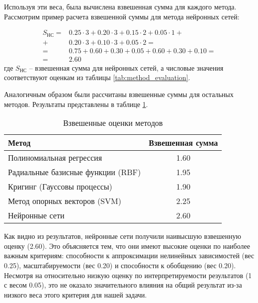 Используя эти веса, была вычислена взвешенная сумма для каждого метода. Рассмотрим пример расчета взвешенной суммы для метода нейронных сетей:

\begin{equation}
	\begin{split}
		S_{НС} = & 0.25 \cdot 3 + 0.20 \cdot 3 + 0.15 \cdot 2 + 0.05 \cdot 1 + \\
		+        & 0.20 \cdot 3 + 0.10 \cdot 3 + 0.05 \cdot 2 =                \\
		=        & 0.75 + 0.60 + 0.30 + 0.05 + 0.60 + 0.30 + 0.10 =            \\
		=        & 2.60
	\end{split}
\end{equation}
где $S_{НС}$ -- взвешенная сумма для нейронных сетей, а числовые значения
соответствуют оценкам из таблицы \ref{tab:method_evaluation}.

Аналогичным образом были рассчитаны взвешенные суммы для остальных методов.
Результаты представлены в таблице \ref{tab:weighted_scores}.

\begin{table}[h]
	\centering
	\caption{Взвешенные оценки методов}
	\begin{tabular}{lc}
		\midrule
		Метод                             & Взвешенная сумма \\
		\midrule
		Полиномиальная регрессия          & 1.60             \\
		Радиальные базисные функции (RBF) & 1.95             \\
		Кригинг (Гауссовы процессы)       & 1.90             \\
		Метод опорных векторов (SVM)      & 2.25             \\
		Нейронные сети                    & 2.60             \\
		\hline
	\end{tabular}
	\label{tab:weighted_scores}
\end{table}

Как видно из результатов, нейронные сети получили наивысшую взвешенную оценку
(2.60). Это объясняется тем, что они имеют высокие оценки по наиболее важным
критериям: способности к аппроксимации нелинейных зависимостей (вес 0.25),
масштабируемости (вес 0.20) и способности к обобщению (вес 0.20). Несмотря на
относительно низкую оценку по интерпретируемости результатов (1 с весом 0.05),
это не оказало значительного влияния на общий результат из-за низкого веса этого
критерия для нашей задачи.

